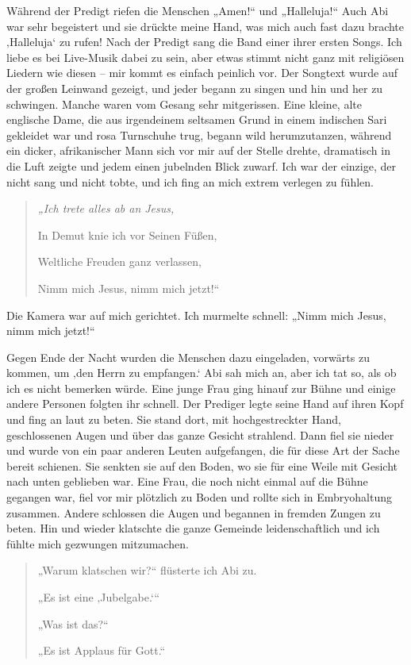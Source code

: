 \documentclass[12pt]{memoir}
\begin{document}
Während der Predigt riefen die Menschen „Amen!“ und „Halleluja!“
Auch Abi war sehr begeistert und sie drückte meine Hand,
was mich auch fast dazu brachte ‚Halleluja‘ zu rufen!
Nach der Predigt sang die Band einer ihrer ersten Songs.
Ich liebe es bei Live-Musik dabei zu sein,
aber etwas stimmt nicht ganz mit religiösen Liedern wie diesen –
mir kommt es einfach peinlich vor.
Der Songtext wurde auf der großen Leinwand gezeigt,
und jeder begann zu singen und hin und her zu schwingen.
Manche waren vom Gesang sehr mitgerissen.
Eine kleine, alte englische Dame,
die aus irgendeinem seltsamen Grund in einem indischen Sari gekleidet war
und rosa Turnschuhe trug, begann wild herumzutanzen,
während ein dicker, afrikanischer Mann sich vor mir
auf der Stelle drehte, dramatisch in die Luft zeigte
und jedem einen jubelnden Blick zuwarf.
Ich war der einzige, der nicht sang und nicht tobte,
und ich fing an mich extrem verlegen zu fühlen.

\begin{quote}
\itshape
„Ich trete alles ab an Jesus,

In Demut knie ich vor Seinen Füßen,

Weltliche Freuden ganz verlassen,

Nimm mich Jesus, nimm mich jetzt!“
\end{quote}

Die Kamera war auf mich gerichtet.
Ich murmelte schnell: „Nimm mich Jesus, nimm mich jetzt!“

Gegen Ende der Nacht wurden die Menschen dazu eingeladen,
vorwärts zu kommen, um ‚den Herrn zu empfangen.‘
Abi sah mich an, aber ich tat so, als ob ich es nicht bemerken würde.
Eine junge Frau ging hinauf zur Bühne
und einige andere Personen folgten ihr schnell.
Der Prediger legte seine Hand auf ihren Kopf und fing an laut zu beten.
Sie stand dort, mit hochgestreckter Hand, geschlossenen Augen und
über das ganze Gesicht strahlend.
Dann fiel sie nieder und wurde von ein paar anderen Leuten aufgefangen,
die für diese Art der Sache bereit schienen.
Sie senkten sie auf den Boden,
wo sie für eine Weile mit Gesicht nach unten geblieben war.
Eine Frau, die noch nicht einmal auf die Bühne gegangen war,
fiel vor mir plötzlich zu Boden und rollte sich in Embryohaltung zusammen.
Andere schlossen die Augen und begannen in fremden Zungen zu beten.
Hin und wieder klatschte die ganze Gemeinde leidenschaftlich
und ich fühlte mich gezwungen mitzumachen.

\begin{quote}
„Warum klatschen wir?“ flüsterte ich Abi zu.

„Es ist eine ‚Jubelgabe.‘“

„Was ist das?“

„Es ist Applaus für Gott.“
\end{quote}
\end{document}
